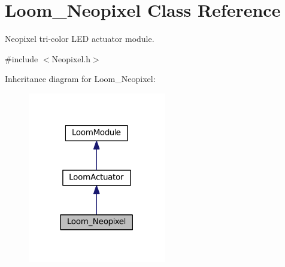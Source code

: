 \hypertarget{class_loom___neopixel}{}\section{Loom\+\_\+\+Neopixel Class Reference}
\label{class_loom___neopixel}


Neopixel tri-\/color L\+ED actuator module.  




{\ttfamily \#include $<$Neopixel.\+h$>$}



Inheritance diagram for Loom\+\_\+\+Neopixel\+:\nopagebreak
\begin{figure}[H]
\begin{center}
\leavevmode
\includegraphics[width=170pt]{class_loom___neopixel__inherit__graph}
\end{center}
\end{figure}
